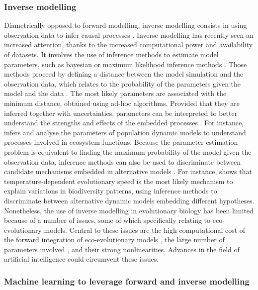 \subsubsection*{Inverse modelling}
Diametrically opposed to forward modelling, inverse modelling consists in using observation data to infer causal processes \cite{Peng2011}. Inverse modelling has recently seen an increased attention, thanks to the increased computational power and availability of datasets.
% 
It involves the use of inference methods to estimate model parameters, such as bayesian or maximum likelihood inference methods \cite{Schartau2017}. Those methods proceed by defining a distance between the model simulation and the observation data, which relates to the probability of the parameters given the model and the data \cite{Schartau2017}. The most likely parameters are associated with the minimum distance, obtained using ad-hoc algorithms.
% 
Provided that they are inferred together with uncertainties, parameters can be interpreted to better understand the strengths and effects of the embedded processes \cite{Pontarp2019}. For instance, \cite{Higgins2010,Curtsdotter2019} infers and analyse the parameters of population dynamic models to understand processes involved in ecosystem functions.
%
Because the parameter estimation problem is equivalent to finding the maximum probability of the model given the observation data, inference methods can also be used to discriminate between candidate mechanisms embedded in alternative models \cite{Burnham2002,Johnson2004}. For instance, \cite{Skeels2022} shows that temperature-dependent evolutionary speed is the most likely mechanism to explain variations in biodiversity patterns, using inference methods to discriminate between alternative dynamic models embedding different hypotheses.
% 
Nonetheless, the use of inverse modelling in evolutionary biology has been limited because of a number of issues, some of which specifically relating to eco-evolutionary models. Central to these issues are the high computational cost of the forward integration of eco-evolutionary models \cite{Fisher2018}, the large number of parameters involved \cite{Boyd2012}, and their strong nonlinearities\cite{Hastings1993,Huisman1999,Beninca2008}. Advances in the field of artificial intelligence could circumvent these issues.

\subsubsection*{Machine learning to leverage forward and inverse modelling}

